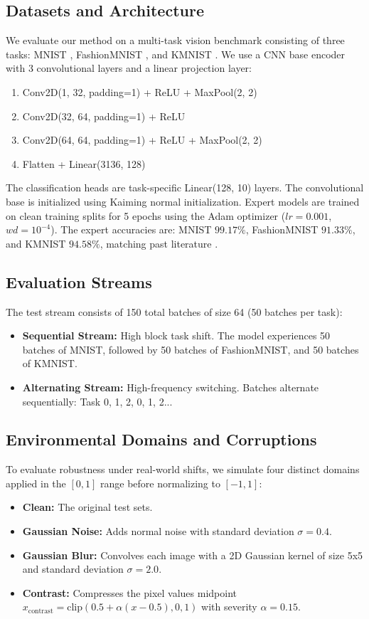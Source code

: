 \documentclass{article}
\theoremstyle{plain}
\theoremstyle{definition}
\theoremstyle{remark}
\begin{document}
\subsection{Datasets and Architecture}
We evaluate our method on a multi-task vision benchmark consisting of three tasks: MNIST \cite{mnist_dataset}, FashionMNIST \cite{fmnist_dataset}, and KMNIST \cite{kmnist_dataset}. We use a CNN base encoder with 3 convolutional layers and a linear projection layer:
\begin{enumerate}
    \item Conv2D(1, 32, padding=1) + ReLU + MaxPool(2, 2)
    \item Conv2D(32, 64, padding=1) + ReLU
    \item Conv2D(64, 64, padding=1) + ReLU + MaxPool(2, 2)
    \item Flatten + Linear(3136, 128)
\end{enumerate}
The classification heads are task-specific Linear(128, 10) layers. The convolutional base is initialized using Kaiming normal initialization. Expert models are trained on clean training splits for 5 epochs using the Adam optimizer ($lr = 0.001$, $wd = 10^{-4}$). The expert accuracies are: MNIST \textbf{$99.17\%$}, FashionMNIST \textbf{$91.33\%$}, and KMNIST \textbf{$94.58\%$}, matching past literature \cite{pc_merge}.

\subsection{Evaluation Streams}
The test stream consists of 150 total batches of size 64 (50 batches per task):
\begin{itemize}
    \item \textbf{Sequential Stream:} High block task shift. The model experiences 50 batches of MNIST, followed by 50 batches of FashionMNIST, and 50 batches of KMNIST.
    \item \textbf{Alternating Stream:} High-frequency switching. Batches alternate sequentially: Task 0, 1, 2, 0, 1, 2...
\end{itemize}

\subsection{Environmental Domains and Corruptions}
To evaluate robustness under real-world shifts, we simulate four distinct domains applied in the $[0, 1]$ range before normalizing to $[-1, 1]$:
\begin{itemize}
    \item \textbf{Clean:} The original test sets.
    \item \textbf{Gaussian Noise:} Adds normal noise with standard deviation $\sigma = 0.4$.
    \item \textbf{Gaussian Blur:} Convolves each image with a 2D Gaussian kernel of size 5x5 and standard deviation $\sigma = 2.0$.
    \item \textbf{Contrast:} Compresses the pixel values midpoint $x_{\text{contrast}} = \text{clip}(0.5 + \alpha(x - 0.5), 0, 1)$ with severity $\alpha = 0.15$.
\end{itemize}
\end{document}
